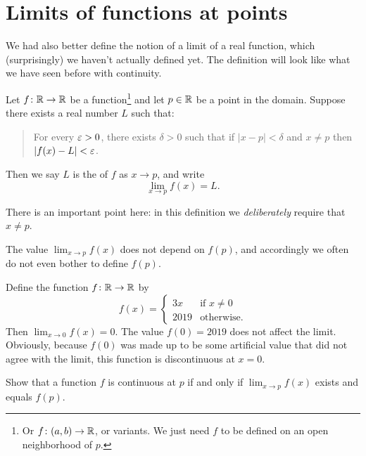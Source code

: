 \section{Limits of functions at points}
We had also better define the notion
of a limit of a real function,
which (surprisingly) we haven't actually defined yet.
The definition will look like what we have seen before with continuity.

\begin{definition}
	Let $f \colon \mathbb R \to \mathbb R$ be a function\footnote{Or
		$f \colon (a,b) \to \mathbb R$, or variants.
		We just need $f$ to be defined on an open neighborhood of $p$.
	} and let $p \in \mathbb R$ be a point in the domain.
	Suppose there exists a real number $L$ such that:
	\begin{quote}
		For every $\varepsilon > 0$, there exists $\delta > 0$
		such that if $\left\lvert x - p \right\rvert < \delta$
		and $x \neq p$ then $\left\lvert f(x) - L \right\rvert < \varepsilon$.
	\end{quote}
	Then we say $L$ is the  of $f$ as $x \to p$, and write
	\[ \lim_{x \to p} f(x) = L. \]
\end{definition}
There is an important point here: in this definition
we \emph{deliberately} require that $x \ne p$.
\begin{moral}
	The value $\lim_{x \to p} f(x)$ does not depend on $f(p)$,
	and accordingly we often do not even bother to define $f(p)$.
\end{moral}
\begin{example}
	Define the function $f \colon \mathbb R \to \mathbb R$ by
	\[ f(x) = \begin{cases}
			3x & \text{if } x \ne 0 \\
			2019 & \text{otherwise}.
		\end{cases} \]
	Then $\lim_{x \to 0} f(x) = 0$.
	The value $f(0) = 2019$ does not affect the limit.
	Obviously, because $f(0)$ was made up to be some artificial
	value that did not agree with the limit,
	this function is discontinuous at $x = 0$.
\end{example}

\begin{ques}
	[Mandatory]
	Show that a function $f$ is continuous at $p$
	if and only if $\lim_{x \to p} f(x)$ exists and equals $f(p)$.
\end{ques}

